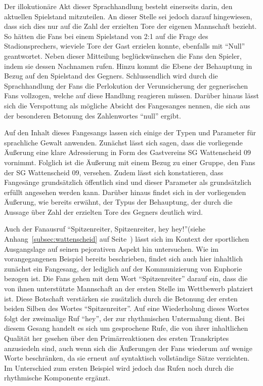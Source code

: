 Der illokutionäre Akt dieser Sprachhandlung besteht einerseits darin, den aktuellen Spielstand mitzuteilen.
An dieser Stelle sei jedoch darauf hingewiesen, dass sich dies nur auf die Zahl der erzielten Tore der eigenen Mannschaft bezieht.
So hätten die Fans bei einem Spielstand von 2:1 auf die Frage des Stadionsprechers, wieviele Tore der Gast erzielen konnte, ebenfalls mit "`Null"' geantwortet.
Neben dieser Mitteilung beglückwünschen die Fans den Spieler, indem sie dessen Nachnamen rufen.
Hinzu kommt die Ebene der Behauptung in Bezug auf den Spielstand des Gegners.
Schlussendlich wird durch die Sprachhandlung der Fans die Perlokution der Verunsicherung der gegnerischen Fans vollzogen, welche auf diese Handlung reagieren müssen.
Darüber hinaus lässt sich die Verspottung als mögliche Absicht des Fangesanges nennen, die sich aus der besonderen Betonung des Zahlenwortes "`null"' ergibt.

Auf den Inhalt dieses Fangesangs lassen sich einige der Typen und Parameter für sprachliche Gewalt anwenden.
Zunächst lässt sich sagen, dass die vorliegende Äußerung eine klare Adressierung in Form des Gastvereins SG Wattenscheid 09 vornimmt.
Folglich ist die Äußerung mit einem Bezug zu einer Gruppe, den Fans der SG Wattenscheid 09, versehen.
Zudem lässt sich konstatieren, dass Fangesänge grundsätzlich öffentlich sind und dieser Parameter als grundsätzlich erfüllt angesehen werden kann.
Darüber hinaus findet sich in der vorliegenden Äußerung, wie bereits erwähnt, der Typus der Behauptung, der durch die Aussage über Zahl der erzielten Tore des Gegners deutlich wird.

Auch der Fanausruf "`Spitzenreiter, Spitzenreiter, hey hey!"'(siehe Anhang~\ref{subsec:wattenscheid} auf Seite~\pageref{subsec:wattenscheid}) lässt sich im Kontext der sportlichen Ausgangslage auf seinen pejorativen Aspekt hin untersuchen.
Wie im vorangegangenen Beispiel bereits beschrieben, findet sich auch hier inhaltlich zunächst ein Fangesang, der lediglich auf der Kommunizierung von Euphorie bezogen ist.
Die Fans gehen mit dem Wort "`Spitzenreiter"' darauf ein, dass die von ihnen unterstützte Mannschaft an der ersten Stelle im Wettbewerb platziert ist.
Diese Botschaft verstärken sie zusätzlich durch die Betonung der ersten beiden Silben des Wortes "`Spitzenreiter"'.
Auf eine Wiederholung dieses Wortes folgt der zweimalige Ruf "`hey"', der zur rhythmischen Untermalung dient.
Bei diesem Gesang handelt es sich um gesprochene Rufe, die von ihrer inhaltlichen Qualität her gesehen über den Primärreaktionen des ersten Transkriptes anzusiedeln sind, auch wenn sich die Äußerungen der Fans wiederum auf wenige Worte beschränken, da sie erneut auf syntaktisch vollständige Sätze verzichten.
Im Unterschied zum ersten Beispiel wird jedoch das Rufen noch durch die rhythmische Komponente ergänzt.

